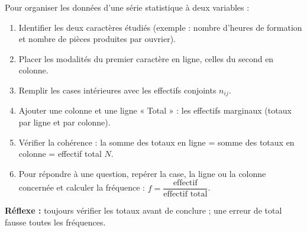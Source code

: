\documentclass[11pt]{article}
\begin{document}
\begin{methode}
Pour organiser les données d'une série statistique à deux variables :
\begin{enumerate}
\item Identifier les deux caractères étudiés (exemple : nombre d'heures de formation et nombre de pièces produites par ouvrier).
\item Placer les modalités du premier caractère en ligne, celles du second en colonne.
\item Remplir les cases intérieures avec les effectifs conjoints $n_{ij}$.
\item Ajouter une colonne et une ligne « Total » : les effectifs marginaux (totaux par ligne et par colonne).
\item Vérifier la cohérence : la somme des totaux en ligne = somme des totaux en colonne = effectif total $N$.
\item Pour répondre à une question, repérer la case, la ligne ou la colonne concernée et calculer la fréquence : $f = \dfrac{\text{effectif}}{\text{effectif total}}$.
\end{enumerate}
\textbf{Réflexe :} toujours vérifier les totaux avant de conclure ; une erreur de total fausse toutes les fréquences.
\end{methode}
\end{document}
